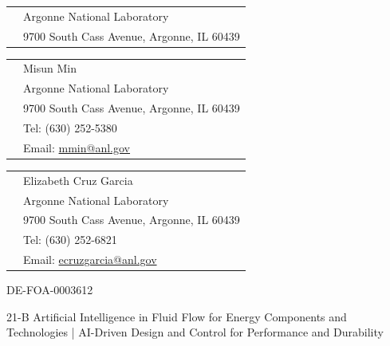 
\begin{center}
    {\large\bf \Title}
\end{center}

\bigskip{} %

\noindent
\begin{tabular}{ll}
 & Argonne National Laboratory\\
 & 9700 South Cass Avenue, Argonne, IL 60439\\
\end{tabular}

\bigskip{}\smallskip

\noindent
\begin{tabular}{ll}
 & Misun Min \\
 & Argonne National Laboratory\\
 & 9700 South Cass Avenue, Argonne, IL 60439\\
 & Tel: (630) 252-5380 \\
 & Email: \url{mmin@anl.gov}\\
\end{tabular}

\bigskip{}\smallskip

\noindent
\begin{tabular}{ll}
& Elizabeth Cruz Garcia\\
 & Argonne National Laboratory\\
 & 9700 South Cass Avenue, Argonne, IL 60439\\
& Tel: (630) 252-6821\\
& Email: \url{ecruzgarcia@anl.gov}\\
\end{tabular}

\bigskip{} DE-FOA-0003612

\bigskip{}
21-B Artificial Intelligence in Fluid Flow for Energy Components and Technologies | AI-Driven Design and Control for Performance and Durability

